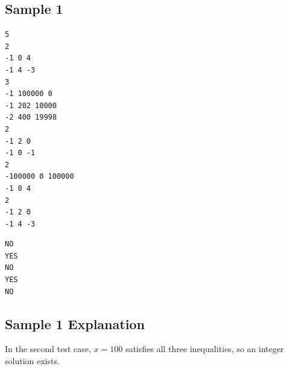 \subsection{Sample 1}

\begin{minipage}{\linewidth}
	\begin{minipage}[t]{0.49\linewidth}
		\begin{lstlisting}[title=\texttt{standard input}]
5
2
-1 0 4
-1 4 -3
3
-1 100000 0
-1 202 10000
-2 400 19998
2
-1 2 0
-1 0 -1
2
-100000 0 100000
-1 0 4
2
-1 2 0
-1 4 -3

\end{lstlisting}
	\end{minipage}
	\begin{minipage}[t]{0.49\linewidth}
		\begin{lstlisting}[title=\texttt{standard output}]
NO
YES
NO
YES
NO
\end{lstlisting}
	\end{minipage}
\end{minipage}


\subsection{Sample 1 Explanation}

In the second test case, $x=100$ satisfies all three inequalities, so an integer solution exists.
